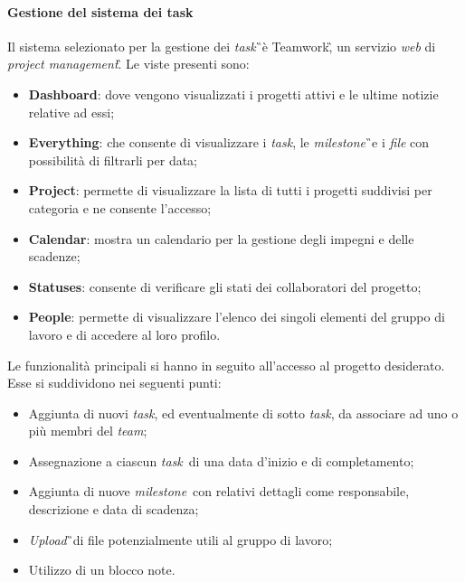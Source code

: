 \paragraph{Gestione del sistema dei task} Il sistema selezionato per la gestione dei \textit{task}\G\ è Teamwork\G, un servizio \textit{web} di \textit{project management}\G. Le viste presenti sono:
\begin{itemize}
\item \textbf{Dashboard}: dove vengono visualizzati i progetti attivi e le ultime notizie relative ad essi;

\item \textbf{Everything}: che consente di visualizzare i \textit{task}, le \textit{milestone}\G\ e i \textit{file} con possibilità di filtrarli per data;

\item \textbf{Project}: permette di visualizzare la lista di tutti i progetti suddivisi per categoria e ne consente l'accesso;

\item \textbf{Calendar}: mostra un calendario per la gestione degli impegni e delle scadenze;

\item \textbf{Statuses}: consente di verificare gli stati dei collaboratori del progetto;

\item \textbf{People}: permette di visualizzare l'elenco dei singoli elementi del gruppo di lavoro e di accedere al loro profilo.    
\end{itemize}

Le funzionalità principali si hanno in seguito all'accesso al progetto desiderato. Esse si suddividono nei seguenti punti:
\begin{itemize}
\item Aggiunta di nuovi \textit{task}, ed eventualmente di sotto \textit{task}, da associare ad uno o più membri del \textit{team};

\item Assegnazione a ciascun \textit{task}\ di una data d'inizio e di completamento;

\item Aggiunta di nuove \textit{milestone}\ con relativi dettagli come responsabile, descrizione e data di scadenza;

\item \textit{Upload}\G\ di file potenzialmente utili al gruppo di lavoro;

\item Utilizzo di un blocco note.
 
\end{itemize}

